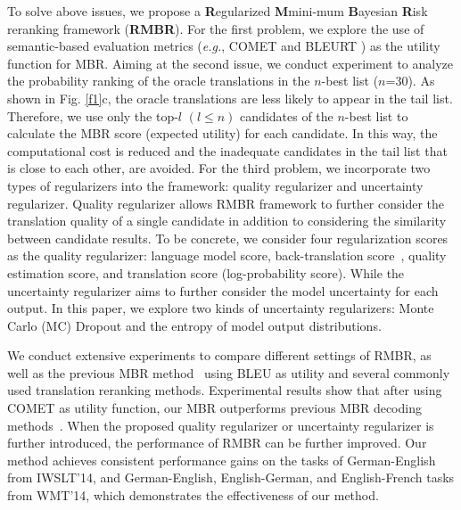 \documentclass{article}
\begin{document}
To solve above issues, we propose a \textbf{R}egularized \textbf{M}mini-mum \textbf{B}ayesian \textbf{R}isk reranking framework (\textbf{RMBR}). For the first problem, we explore the use of semantic-based evaluation metrics (\textit{e.g.}, COMET \cite{27} and BLEURT \cite{28}) as the utility function for MBR. Aiming at the second issue, we conduct experiment to analyze the probability ranking of the oracle translations in the $n$-best list ($n$=30). As shown in Fig. \ref{f1}c, the oracle translations are less likely to appear in the tail list. Therefore, we use only the top-$l$ $(l \leq n)$ candidates of the $n$-best list to calculate the MBR score (expected utility) for each candidate. In this way, the computational cost is reduced and the inadequate candidates in the tail list that is close to each other, are avoided. For the third problem, we incorporate two types of regularizers into the framework: quality regularizer and uncertainty regularizer. Quality regularizer allows RMBR framework to further consider the translation quality of a single candidate in addition to considering the similarity between candidate results. To be concrete, we consider four regularization scores as the quality regularizer: language model score, back-translation score~\cite{52}, quality estimation score, and translation score (log-probability score). While the uncertainty regularizer aims to further consider the model uncertainty for each output. In this paper, we explore two kinds of uncertainty regularizers: Monte Carlo (MC) Dropout \cite{53,35} and the entropy of model output distributions.

We conduct extensive experiments to compare different settings of RMBR, as well as the previous MBR method~\cite{14,20} using BLEU as utility and several commonly used translation reranking methods. Experimental results show that after using COMET as utility function, our MBR outperforms previous MBR decoding methods~\cite{14,20}. When the proposed quality regularizer or uncertainty regularizer is further introduced, the performance of RMBR can be further improved. Our method achieves consistent performance gains on the tasks of German-English from IWSLT’14, and German-English, English-German, and English-French tasks from WMT’14, which demonstrates the effectiveness of our method.
\end{document}
